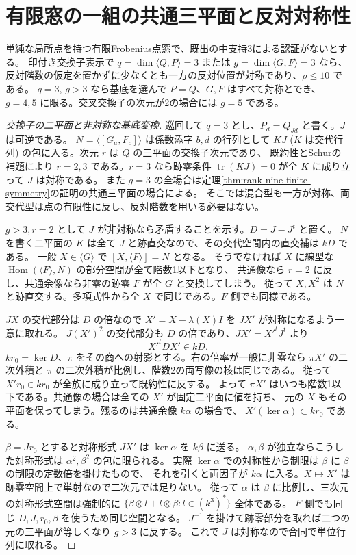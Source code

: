 \section{有限窓の一組の共通三平面と反対対称性}
\label{sec:marked-common-triple-symmetry}
\begin{theorem}\label{thm:marked-common-triple-symmetry}
単純な局所点を持つ有限Frobenius点窓で、既出の中支持3による認証がないとする。
印付き交換子表示で $q=\dim\langle Q,P\rangle=3$ または $g=\dim\langle G,F\rangle=3$ なら、
反対階数の仮定を置かずに少なくとも一方の反対位置が対称であり、$\rho\le10$ である。
$q=3$, $g>3$ なら基底を選んで $P=Q$、$G,F$ はすべて対称とでき、
$g=4,5$ に限る。交叉交換子の次元が2の場合には $g=5$ である。
\end{theorem}
\begin{proof}[交換子の二平面と非対称な基底変換]
巡回して $q=3$ とし、$P_d=Q_{Jd}$ と書く。$J$ は可逆である。
$N=\langle[G_a,F_c]\rangle$ は係数添字 $b,d$ の行列として
$KJ$ ($K$ は交代行列) の包に入る。次元 $r$ は $Q$ の三平面の交換子次元であり、
既約性とSchurの補題により $r=2,3$ である。$r=3$ なら跡零条件
$\operatorname{tr}(KJ)=0$ が全 $K$ に成り立って $J$ は対称である。
また $g=3$ の全場合は定理\ref{thm:rank-nine-finite-symmetry}の証明の共通三平面の場合による。
そこでは混合型も一方が対称、両交代型は点の有限性に反し、反対階数を用いる必要はない。

$g>3,r=2$ として $J$ が非対称なら矛盾することを示す。$D=J-J^t$ と置く。
$N$ を書く二平面の $K$ は全て $J$ と跡直交なので、その交代空間内の直交補は $kD$ である。
一般 $X\in\langle G\rangle$ で $[X,\langle F\rangle]=N$ となる。
そうでなければ $X$ に線型な $\operatorname{Hom}(\langle F\rangle,N)$ の部分空間が全て階数1以下となり、
共通像なら $r=2$ に反し、共通余像なら非零の跡零 $F$ が全 $G$ と交換してしまう。
従って $X,X^2$ は $N$ と跡直交する。多項式性から全 $X$ で同じである。$F$ 側でも同様である。

$JX$ の交代部分は $D$ の倍なので $X'=X-\lambda(X)I$ を $JX'$ が対称になるよう一意に取れる。
$J(X')^2$ の交代部分も $D$ の倍であり、$JX'=X'^tJ^t$ より
\[
                       X'^t D X'\in kD .
\]
$kr_0=\ker D$、$\pi$ をその商への射影とする。右の倍率が一般に非零なら
$\pi X'$ の二次外積と $\pi$ の二次外積が比例し、階数2の両写像の核は同じである。
従って $X'r_0\in kr_0$ が全族に成り立って既約性に反する。
よって $\pi X'$ はいつも階数1以下である。共通像の場合は全ての $X'$ が固定二平面に値を持ち、
元の $X$ もその平面を保ってしまう。残るのは共通余像 $k\alpha$ の場合で、
$X'(\ker\alpha)\subset kr_0$ である。

$\beta=Jr_0$ とすると対称形式 $JX'$ は $\ker\alpha$ を $k\beta$ に送る。
$\alpha,\beta$ が独立ならこうした対称形式は $\alpha^2,\beta^2$ の包に限られる。
実際 $\ker\alpha$ での対称性から制限は $\beta$ に $\beta$ の制限の定数倍を掛けたもので、
それを引くと両因子が $k\alpha$ に入る。$X\mapsto X'$ は跡零空間上で単射なので二次元では足りない。
従って $\alpha$ は $\beta$ に比例し、三次元の対称形式空間は強制的に
$\{\beta\otimes l+l\otimes\beta:l\in(k^3)^*\}$ 全体である。
$F$ 側でも同じ $D,J,r_0,\beta$ を使うため同じ空間となる。
$J^{-1}$ を掛けて跡零部分を取れば二つの元の三平面が等しくなり $g>3$ に反する。
これで $J$ は対称なので合同で単位行列に取れる。
\end{proof}
